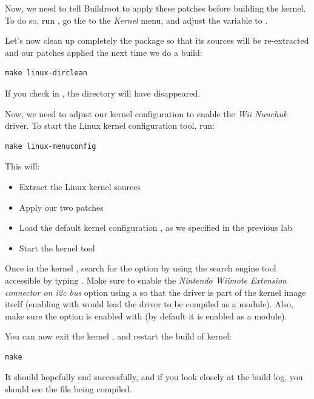 Now, we need to tell Buildroot to apply these patches before building
the kernel. To do so, run , go the to the {\em
Kernel} menu, and adjust the  variable to
.

Let's now clean up completely the  package so that its
sources will be re-extracted and our patches applied the next time we
do a build:

\begin{verbatim}
make linux-dirclean
\end{verbatim}

If you check in , the  directory
will have disappeared.

Now, we need to adjust our kernel configuration to enable the {\em Wii
Nunchuk} driver. To start the Linux kernel configuration tool, run:

\begin{verbatim}
make linux-menuconfig
\end{verbatim}

This will:

\begin{itemize}
\item Extract the Linux kernel sources
\item Apply our two patches
\item Load the default kernel configuration
  , as we specified in the previous lab
\item Start the kernel  tool
\end{itemize}

Once in the kernel , search for the option
 by using the search engine tool
accessible by typing \code{/}. Make sure to enable the {\em Nintendo
  Wiimote Extension connector on i2c bus} option using a \code{*} so
that the driver is part of the kernel image itself (enabling with
 would lead the driver to be compiled as a module). Also, make
sure the  option is enabled with \code{*} (by
default it is enabled as a module).

You can now exit the kernel , and restart the build
of kernel:

\begin{verbatim}
make
\end{verbatim}

It should hopefully end successfully, and if you look closely at the
build log, you should see the file  being compiled.

